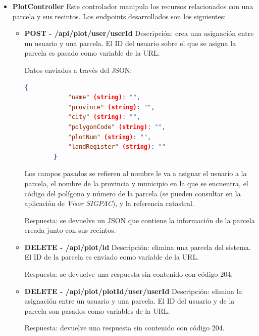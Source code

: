 \begin{itemize}
    \item \textbf{PlotController}
    \newline
    Este controlador manipula los recursos relacionados con una parcela y sus recintos. Los endpoints desarrollados son los siguientes:

    \begin{itemize}
        \item \textbf{POST - /api/plot/user/{userId}} \newline
        Descripción: crea una asignación entre un usuario y una parcela. El ID del usuario sobre el que se asigna la parcela es pasado como 
        variable de la URL. 

        Datos enviados a través del JSON:
        \begin{lstlisting}[language=json,caption={Creación de asignación entre usuario y parcela}]
        {
            "name" (string): "",
            "province" (string): "",
            "city" (string): "",
            "polygonCode" (string): "",
            "plotNum" (string): "",
            "landRegister" (string): ""
        }
        \end{lstlisting}

        Los campos pasados se refieren al nombre le va a asignar el usuario a la parcela, el nombre de la provincia y municipio en la que se 
        encuentra, el código del polígono y número de la parcela (se pueden consultar en la aplicación de \textit{Visor SIGPAC}), y la
        referencia catastral.

        Respuesta: se devuelve un JSON que contiene la información de la parcela creada junto con sus recintos.

        \item \textbf{DELETE - /api/plot/{id}} \newline
        Descripción: elimina una parcela del sistema. El ID de la parcela es enviado como variable de la URL. 

        Respuesta: se devuelve una respuesta sin contenido con código 204.

        \item \textbf{DELETE - /api/plot/{plotId}/user/{userId}} \newline
        Descripción: elimina la asignación entre un usuario y una parcela. El ID del usuario y de la parcela son pasados como variables de la
        URL. 

        Respuesta: devuelve una respuesta sin contenido con código 204.


\end{itemize}
\end{itemize}

